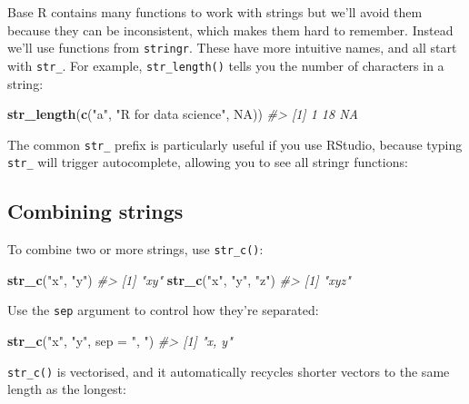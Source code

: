 \documentclass[]{book}
\newenvironment{Shaded}{\begin{snugshade}}{\end{snugshade}}
\newcommand{\CommentTok}[1]{\textcolor[rgb]{0.56,0.35,0.01}{\textit{#1}}}
\newcommand{\DataTypeTok}[1]{\textcolor[rgb]{0.13,0.29,0.53}{#1}}
\newcommand{\KeywordTok}[1]{\textcolor[rgb]{0.13,0.29,0.53}{\textbf{#1}}}
\newcommand{\NormalTok}[1]{#1}
\newcommand{\OtherTok}[1]{\textcolor[rgb]{0.56,0.35,0.01}{#1}}
\newcommand{\StringTok}[1]{\textcolor[rgb]{0.31,0.60,0.02}{#1}}
\begin{document}
Base R contains many functions to work with strings but we'll avoid them because they can be inconsistent, which makes them hard to remember. Instead we'll use functions from \texttt{stringr}. These have more intuitive names, and all start with \texttt{str\_}. For example, \texttt{str\_length()} tells you the number of characters in a string:

\begin{Shaded}
\begin{Highlighting}[]
\KeywordTok{str_length}\NormalTok{(}\KeywordTok{c}\NormalTok{(}\StringTok{"a"}\NormalTok{, }\StringTok{"R for data science"}\NormalTok{, }\OtherTok{NA}\NormalTok{))}
\CommentTok{#> [1]  1 18 NA}
\end{Highlighting}
\end{Shaded}

The common \texttt{str\_} prefix is particularly useful if you use RStudio, because typing \texttt{str\_} will trigger autocomplete, allowing you to see all stringr functions:

\hypertarget{combining-strings}{%
\subsection{Combining strings}\label{combining-strings}}

To combine two or more strings, use \texttt{str\_c()}:

\begin{Shaded}
\begin{Highlighting}[]
\KeywordTok{str_c}\NormalTok{(}\StringTok{"x"}\NormalTok{, }\StringTok{"y"}\NormalTok{)}
\CommentTok{#> [1] "xy"}
\KeywordTok{str_c}\NormalTok{(}\StringTok{"x"}\NormalTok{, }\StringTok{"y"}\NormalTok{, }\StringTok{"z"}\NormalTok{)}
\CommentTok{#> [1] "xyz"}
\end{Highlighting}
\end{Shaded}

Use the \texttt{sep} argument to control how they're separated:

\begin{Shaded}
\begin{Highlighting}[]
\KeywordTok{str_c}\NormalTok{(}\StringTok{"x"}\NormalTok{, }\StringTok{"y"}\NormalTok{, }\DataTypeTok{sep =} \StringTok{", "}\NormalTok{)}
\CommentTok{#> [1] "x, y"}
\end{Highlighting}
\end{Shaded}

\texttt{str\_c()} is vectorised, and it automatically recycles shorter vectors to the same length as the longest:
\end{document}
